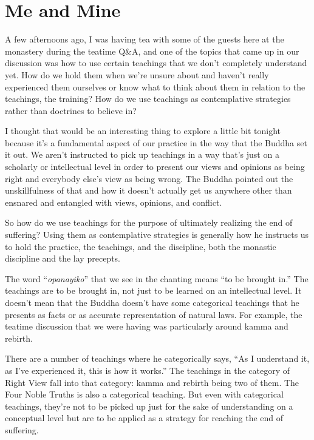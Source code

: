 
\chapter{Me and Mine}


A few afternoons ago, I was having tea with some of the guests here at the monastery during the teatime Q\&A, and one of the topics that came up in our discussion was how to use certain teachings that we don't completely understand yet. How do we hold them when we're unsure about and haven't really experienced them ourselves or know what to think about them in relation to the teachings, the training? How do we use teachings as contemplative strategies rather than doctrines to believe in?

I thought that would be an interesting thing to explore a little bit tonight because it's a fundamental aspect of our practice in the way that the Buddha set it out. We aren't instructed to pick up teachings in a way that's just on a scholarly or intellectual level in order to present our views and opinions as being right and everybody else's view as being wrong. The Buddha pointed out the unskillfulness of that and how it doesn't actually get us anywhere other than ensnared and entangled with views, opinions, and conflict.

So how do we use teachings for the purpose of ultimately realizing the end of suffering? Using them as contemplative strategies is generally how he instructs us to hold the practice, the teachings, and the discipline, both the monastic discipline and the lay precepts.

The word ``\emph{opanayiko}'' that we see in the chanting means ``to be brought in.'' The teachings are to be brought in, not just to be learned on an intellectual level. It doesn't mean that the Buddha doesn't have some categorical teachings that he \linebreak presents as facts or as accurate representation of natural laws. For example, the teatime discussion that we were having was particularly around kamma and rebirth.

There are a number of teachings where he categorically says, ``As I understand it, as I've experienced it, this is how it works.'' The teachings in the category of Right View fall into that category: kamma and rebirth being two of them. The Four Noble Truths is also a categorical teaching. But even with categorical teachings, they're not to be picked up just for the sake of understanding on a conceptual level but are to be applied as a strategy for reaching the end of suffering.

